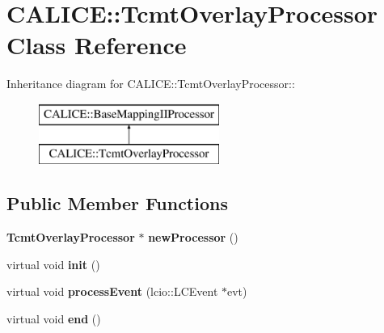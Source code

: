 \section{CALICE::TcmtOverlayProcessor Class Reference}
\label{classCALICE_1_1TcmtOverlayProcessor}
Inheritance diagram for CALICE::TcmtOverlayProcessor::\begin{figure}[H]
\begin{center}
\leavevmode
\includegraphics[height=2cm]{classCALICE_1_1TcmtOverlayProcessor}
\end{center}
\end{figure}
\subsection*{Public Member Functions}
\begin{DoxyCompactItemize}
\item 
{\bf TcmtOverlayProcessor} $\ast$ {\bfseries newProcessor} ()\label{classCALICE_1_1TcmtOverlayProcessor_a491ee74bd3a2849b4c5e590e78c5966e}

\item 
virtual void {\bfseries init} ()\label{classCALICE_1_1TcmtOverlayProcessor_a47c6fb10b94cdd75b6b2568f97163e57}

\item 
virtual void {\bfseries processEvent} (lcio::LCEvent $\ast$evt)\label{classCALICE_1_1TcmtOverlayProcessor_a19126164de84b0d41acf25e8d2074b93}

\item 
virtual void {\bfseries end} ()\label{classCALICE_1_1TcmtOverlayProcessor_a58abd4dd600627ba59982ad1458f795b}

\end{DoxyCompactItemize}
